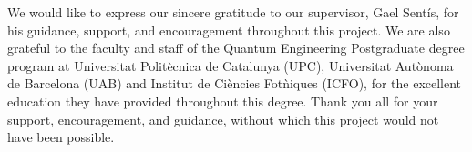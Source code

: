 We would like to express our sincere gratitude to our supervisor, Gael Sent\'is, for his guidance, support, and encouragement throughout this project. We are also grateful to the faculty and staff of the Quantum Engineering Postgraduate degree program at Universitat Polit\`ecnica de Catalunya (UPC), Universitat Aut\`onoma de Barcelona (UAB) and Institut de Ci\`encies Fot\`niques (ICFO), for the excellent education they have provided throughout this degree. Thank you all for your support, encouragement, and guidance, without which this project would not have been possible.
